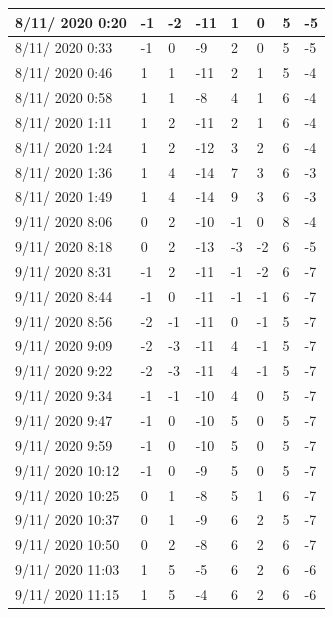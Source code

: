 \begin{table}[h]
\begin{tabular}{|p{3cm}|p{1cm}|p{1cm}|p{1cm}|p{1cm}|p{1cm}|p{1cm}|p{1cm}|}
8/11/ 2020 0:20&-1&	-2&	-11&	1&	0&	5&	-5 \\ \hline
8/11/ 2020 0:33&-1&	0&	-9&	    2&	0&	5&	-5 \\ \hline
8/11/ 2020 0:46&1&	1&	-11&	2&	1&	5&	-4 \\ \hline
8/11/ 2020 0:58&1&	1&	-8&	    4&	1&	6&	-4 \\ \hline
8/11/ 2020 1:11&1&	2&	-11&	2&	1&	6&	-4 \\ \hline
8/11/ 2020 1:24&1&	2&	-12&	3&	2&	6&	-4 \\ \hline
8/11/ 2020 1:36&1&	4&	-14&	7&	3&	6&	-3 \\ \hline
8/11/ 2020 1:49&1&	4&	-14&	9&	3&	6&	-3 \\ \hline
9/11/ 2020 8:06&0&	2&	-10&	-1&	0&	8&	-4 \\ \hline
9/11/ 2020 8:18&0&	2&	-13&	-3&	-2&	6&	-5 \\ \hline
9/11/ 2020 8:31&-1&	2&	-11&	-1&	-2&	6&	-7 \\ \hline
9/11/ 2020 8:44&	-1&	0&	-11&-1&	-1&	6&	-7 \\ \hline
9/11/ 2020 8:56&	-2&	-1&	-11&0&	-1&	5&	-7 \\ \hline
9/11/ 2020 9:09&	-2&	-3&	-11&4&	-1&	5&	-7 \\ \hline
9/11/ 2020 9:22&	-2&	-3&	-11&4&	-1&	5&	-7 \\ \hline
9/11/ 2020 9:34&	-1&	-1&	-10&4&	0&	5&	-7 \\ \hline
9/11/ 2020 9:47&	-1&	0&	-10&5&	0&	5&	-7 \\ \hline
9/11/ 2020 9:59&	-1&	0&	-10&5&	0&	5&	-7 \\ \hline
9/11/ 2020 10:12&	-1&	0&	-9&	5&	0&	5&	-7 \\ \hline
9/11/ 2020 10:25&	0&	1&	-8&	5&	1&	6&	-7 \\ \hline
9/11/ 2020 10:37&	0&	1&	-9&	6&	2&	5&	-7 \\ \hline
9/11/ 2020 10:50&	0&	2&	-8&	6&	2&	6&	-7 \\ \hline
9/11/ 2020 11:03&	1&	5&	-5&	6&	2&	6&	-6 \\ \hline
9/11/ 2020 11:15&	1&	5&	-4&	6&	2&	6&	-6 \\ \hline
    \end{tabular}
\end{table}
